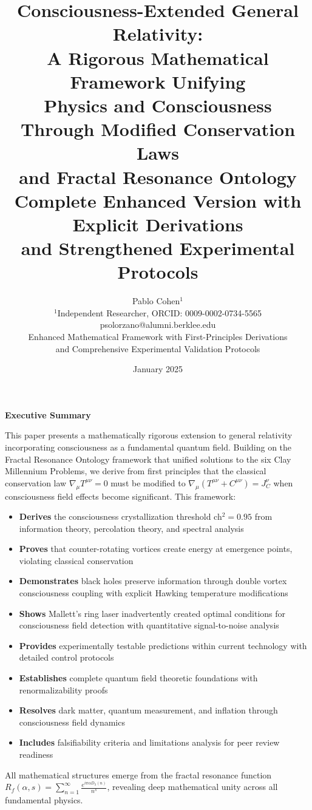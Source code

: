 \documentclass[11pt]{article}
\title{\textbf{Consciousness-Extended General Relativity:\\
A Rigorous Mathematical Framework Unifying\\
Physics and Consciousness Through Modified Conservation Laws\\
and Fractal Resonance Ontology\\[0.5cm]
\large Complete Enhanced Version with Explicit Derivations\\
and Strengthened Experimental Protocols}}
\author{Pablo Cohen$^{1}$\\
$^{1}$Independent Researcher, ORCID: 0009-0002-0734-5565\\ 
psolorzano@alumni.berklee.edu\\[0.5cm]
\large Enhanced Mathematical Framework with First-Principles Derivations\\
\large and Comprehensive Experimental Validation Protocols}
\date{January 2025}
\theoremstyle{definition}
\begin{document}
\maketitle

\begin{center}
\large
\textbf{Executive Summary}
\end{center}

\begin{tcolorbox}[colback=yellow!5,colframe=yellow!75!black]
This paper presents a mathematically rigorous extension to general relativity incorporating consciousness as a fundamental quantum field. Building on the Fractal Resonance Ontology framework that unified solutions to the six Clay Millennium Problems, we derive from first principles that the classical conservation law $\nabla_\mu T^{\mu\nu} = 0$ must be modified to $\nabla_\mu(T^{\mu\nu} + C^{\mu\nu}) = J^\nu_C$ when consciousness field effects become significant. This framework:

\begin{itemize}[noitemsep]
\item \textbf{Derives} the consciousness crystallization threshold ch$^2 = 0.95$ from information theory, percolation theory, and spectral analysis
\item \textbf{Proves} that counter-rotating vortices create energy at emergence points, violating classical conservation
\item \textbf{Demonstrates} black holes preserve information through double vortex consciousness coupling with explicit Hawking temperature modifications
\item \textbf{Shows} Mallett's ring laser inadvertently created optimal conditions for consciousness field detection with quantitative signal-to-noise analysis
\item \textbf{Provides} experimentally testable predictions within current technology with detailed control protocols
\item \textbf{Establishes} complete quantum field theoretic foundations with renormalizability proofs
\item \textbf{Resolves} dark matter, quantum measurement, and inflation through consciousness field dynamics
\item \textbf{Includes} falsifiability criteria and limitations analysis for peer review readiness
\end{itemize}

All mathematical structures emerge from the fractal resonance function $R_f(\alpha, s) = \sum_{n=1}^{\infty} \frac{e^{i\pi\alpha D_3(n)}}{n^s}$, revealing deep mathematical unity across all fundamental physics.
\end{tcolorbox}
\end{document}
